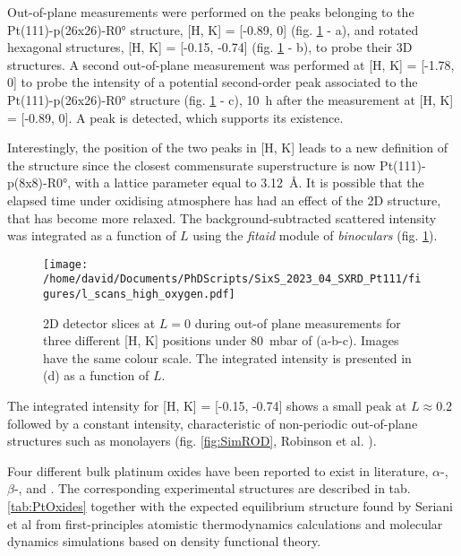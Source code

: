 Out-of-plane measurements were performed on the peaks belonging to the Pt(111)-p(26x26)-R\ang{0} structure, [H, K] = [-0.89, 0] (fig. \ref{fig:LScans80} - a), and rotated hexagonal structures, [H, K] = [-0.15, -0.74] (fig. \ref{fig:LScans80} - b), to probe their 3D structures.
A second out-of-plane measurement was performed at [H, K] = [-1.78, 0] to probe the intensity of a potential second-order peak associated to the Pt(111)-p(26x26)-R\ang{0} structure (fig. \ref{fig:LScans80} - c), \qty{10}{\hour} after the measurement at [H, K] = [-0.89, 0].
A peak is detected, which supports its existence.

Interestingly, the position of the two peaks in [H, K] leads to a new definition of the structure since the closest commensurate superstructure is now Pt(111)-p(8x8)-R\ang{0}, with a lattice parameter equal to \qty{3.12}{\angstrom}.
It is possible that the elapsed time under oxidising atmosphere has had an effect of the 2D structure, that has become more relaxed.
The background-subtracted scattered intensity was integrated as a function of $L$ using the \textit{fitaid} module of \textit{binoculars} (fig. \ref{fig:LScans80}).

\begin{figure}[!htb]
    \centering
    \texttt{[image: /home/david/Documents/PhDScripts/SixS\_2023\_04\_SXRD\_Pt111/figures/l\_scans\_high\_oxygen.pdf]}
    \caption{
        2D detector slices at $L=0$ during out-of plane measurements for three different [H, K] positions under \qty{80}{\milli\bar} of  (a-b-c).
        Images have the same colour scale.
        The integrated intensity is presented in (d) as a function of $L$.
    }
    \label{fig:LScans80}
\end{figure}

The integrated intensity for [H, K] = [-0.15, -0.74] shows a small peak at $L\approx 0.2$ followed by a constant intensity, characteristic of non-periodic out-of-plane structures such as monolayers (fig. \ref{fig:SimROD}, Robinson et al. \cite*{Robinson1991}).

Four different bulk platinum oxides have been reported to exist in literature, $\alpha$-, $\beta$-,  and .
The corresponding experimental structures are described in tab. \ref{tab:PtOxides} together with the expected equilibrium structure found by Seriani et al \parencite*{Seriani2006, Seriani2008} from first-principles atomistic thermodynamics calculations and molecular dynamics simulations based on density functional theory.

